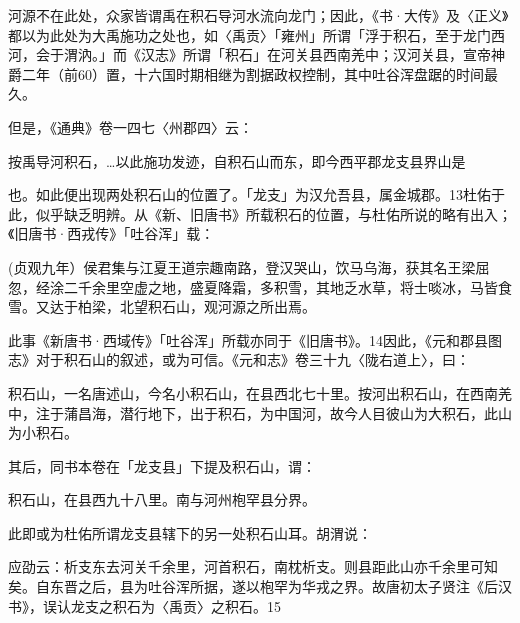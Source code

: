 河源不在此处，众家皆谓禹在积石导河水流向龙门；因此，《书·大传》及〈正义》都以为此处为大禹施功之处也，如〈禹贡〉「雍州」所谓「浮于积石，至于龙门西河，会于渭汭。」而《汉志》所谓「积石」在河关县西南羌中；汉河关县，宣帝神爵二年（前60）置，十六国时期相继为割据政权控制，其中吐谷浑盘踞的时间最久。

但是，《通典》卷一四七〈州郡四〉云：

\begin{BookQuote}
按禹导河积石，…以此施功发迹，自积石山而东，即今西平郡龙支县界山是
\end{BookQuote}

也。如此便出现两处积石山的位置了。「龙支」为汉允吾县，属金城郡。13杜佑于此，似乎缺乏明辨。从《新、旧唐书》所载积石的位置，与杜佑所说的略有出入；《旧唐书·西戎传》「吐谷浑」载：

\begin{BookQuote}
(贞观九年）侯君集与江夏王道宗趣南路，登汉哭山，饮马乌海，获其名王梁屈忽，经涂二千余里空虚之地，盛夏降霜，多积雪，其地乏水草，将士啖冰，马皆食雪。又达于柏梁，北望积石山，观河源之所出焉。
\end{BookQuote}

\vfill
\begin{BookNotes}
\end{BookNotes}

\noindent 此事《新唐书·西域传》「吐谷浑」所载亦同于《旧唐书》。14因此，《元和郡县图志》对于积石山的叙述，或为可信。《元和志》卷三十九〈陇右道上〉，曰：

\begin{BookQuote}
积石山，一名唐述山，今名小积石山，在县西北七十里。按河出积石山，在西南羌中，注于蒲昌海，潜行地下，出于积石，为中国河，故今人目彼山为大积石，此山为小积石。
\end{BookQuote}

其后，同书本卷在「龙支县」下提及积石山，谓：

\begin{BookQuote}
积石山，在县西九十八里。南与河州枹罕县分界。
\end{BookQuote}

此即或为杜佑所谓龙支县辖下的另一处积石山耳。胡渭说：

\begin{BookQuote}
应劭云：析支东去河关千余里，河首积石，南枕析支。则县距此山亦千余里可知矣。自东晋之后，县为吐谷浑所据，遂以枹罕为华戎之界。故唐初太子贤注《后汉书》，误认龙支之积石为〈禹贡〉之积石。15
\end{BookQuote}

